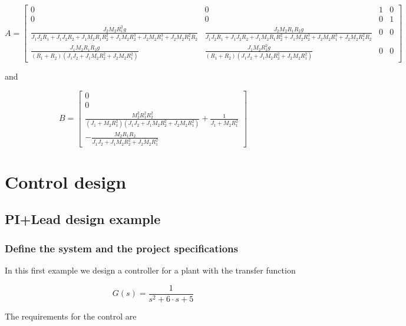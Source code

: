 $$
A=\left[\begin{smallmatrix}0 & 0 & 1 & 0\\0 & 0 & 0 & 1\\\frac{J_{2} M_{2} 
R_{1}^{2} g}{J_{1} J_{2} R_{1} + J_{1} J_{2} R_{2} + J_{1} M_{2} R_{1} 
R_{2}^{2} + J_{1} M_{2} R_{2}^{3} + J_{2} M_{2} R_{1}^{3} + J_{2} M_{2} 
R_{1}^{2} R_{2}} & \frac{J_{2} M_{2} R_{1} R_{2} g}{J_{1} J_{2} R_{1} + J_{1} 
J_{2} R_{2} + J_{1} M_{2} R_{1} R_{2}^{2} + J_{1} M_{2} R_{2}^{3} + J_{2} M_{2} 
R_{1}^{3} + J_{2} M_{2} R_{1}^{2} R_{2}} & 0 & 0\\\frac{J_{1} M_{2} R_{1} R_{2} 
g}{\left(R_{1} + R_{2}\right) \left(J_{1} J_{2} + J_{1} M_{2} R_{2}^{2} + J_{2} 
M_{2} R_{1}^{2}\right)} & \frac{J_{1} M_{2} R_{2}^{2} g}{\left(R_{1} + 
R_{2}\right) \left(J_{1} J_{2} + J_{1} M_{2} R_{2}^{2} + J_{2} M_{2} 
R_{1}^{2}\right)} & 0 & 0\end{smallmatrix}\right]
$$

and

$$
B=\left[\begin{smallmatrix}0\\0\\\frac{M_{2}^{2} R_{1}^{2} 
R_{2}^{2}}{\left(J_{1} + M_{2} R_{1}^{2}\right) \left(J_{1} J_{2} + J_{1} M_{2} 
R_{2}^{2} + J_{2} M_{2} R_{1}^{2}\right)} + \frac{1}{J_{1} + M_{2} 
R_{1}^{2}}\\- \frac{M_{2} R_{1} R_{2}}{J_{1} J_{2} + J_{1} M_{2} R_{2}^{2} + 
J_{2} M_{2} R_{1}^{2}}\end{smallmatrix}\right]
$$

\chapter{Control design}

\section{PI+Lead design example}

\subsection{Define the system and the project specifications}

In this first example we design a controller for a plant with the transfer 
function
 
$$
G(s)=\frac{1}{s^2 + 6\cdot s + 5}
$$
 
The requirements for the control are
 
